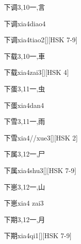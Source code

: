 \begin{Entry}{下调}{3,10}{⼀,⾔}
  \begin{Phonetics}{下调}{xia4diao4}
  \end{Phonetics}
  \begin{Phonetics}{下调}{xia4tiao2}[][HSK 7-9]
  \end{Phonetics}
\end{Entry}

\begin{Entry}{下载}{3,10}{⼀,⾞}
  \begin{Phonetics}{下载}{xia4zai3}[][HSK 4]
  \end{Phonetics}
\end{Entry}

\begin{Entry}{下蛋}{3,11}{⼀,⾍}
  \begin{Phonetics}{下蛋}{xia4dan4}
  \end{Phonetics}
\end{Entry}

\begin{Entry}{下雪}{3,11}{⼀,⾬}
  \begin{Phonetics}{下雪}{xia4//xue3}[][HSK 2]
  \end{Phonetics}
\end{Entry}

\begin{Entry}{下属}{3,12}{⼀,⼫}
  \begin{Phonetics}{下属}{xia4shu3}[][HSK 7-9]
  \end{Phonetics}
\end{Entry}

\begin{Entry}{下崽}{3,12}{⼀,⼭}
  \begin{Phonetics}{下崽}{xia4 zai3}
  \end{Phonetics}
\end{Entry}

\begin{Entry}{下期}{3,12}{⼀,⽉}
  \begin{Phonetics}{下期}{xia4qi1}[][HSK 7-9]
  \end{Phonetics}
\end{Entry}


